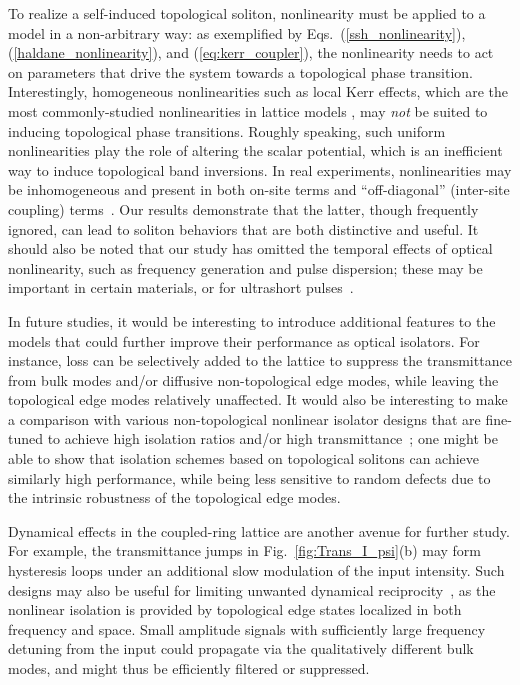 \documentclass[aps,prx,twocolumn,superscriptaddress]{revtex4-1}
\begin{document}
To realize a self-induced topological soliton, nonlinearity must be applied to a model in a non-arbitrary way: as exemplified by Eqs.~(\ref{ssh_nonlinearity}), (\ref{haldane_nonlinearity}), and (\ref{eq:kerr_coupler}), the nonlinearity needs to act on parameters that drive the system towards a topological phase transition.  Interestingly, homogeneous nonlinearities such as local Kerr effects, which are the most commonly-studied nonlinearities in lattice models \cite{Makris2005,Suntsov2006,Suntsov2007,christodoulides1988}, may \textit{not} be suited to inducing topological phase transitions.  Roughly speaking, such uniform nonlinearities play the role of altering the scalar potential, which is an inefficient way to induce topological band inversions.  In real experiments, nonlinearities may be inhomogeneous and present in both on-site terms and ``off-diagonal'' (inter-site coupling) terms~\cite{nonlinear_lattices}.  Our results demonstrate that the latter, though frequently ignored, can lead to soliton behaviors that are both distinctive and useful.  It should also be noted that our study has omitted the temporal effects of optical nonlinearity, such as frequency generation and pulse dispersion; these may be important in certain materials, or for ultrashort pulses~\cite{boyd_book}. 

In future studies, it would be interesting to introduce additional features to the models that could further improve their performance as optical isolators.  For instance, loss can be selectively added to the lattice to suppress the transmittance from bulk modes and/or diffusive non-topological edge modes, while leaving the topological edge modes relatively unaffected.  It would also be interesting to make a comparison with various non-topological nonlinear isolator designs that are fine-tuned to achieve high isolation ratios and/or high transmittance~\cite{lepri2011prl,anand2013nl,lepri2013pre,xu2014prb}; one might be able to show that isolation schemes based on topological solitons can achieve similarly high performance, while being less sensitive to random defects due to the intrinsic robustness of the topological edge modes.

Dynamical effects in the coupled-ring lattice are another avenue for further study. For example, the transmittance jumps in Fig.~\ref{fig:Trans_I_psi}(b) may form hysteresis loops under an additional slow modulation of the input intensity.  Such designs may also be useful for limiting unwanted dynamical reciprocity~\cite{fan2009}, as the nonlinear isolation is provided by topological edge states localized in both frequency and space. Small amplitude signals with sufficiently large frequency detuning from the input could propagate via the qualitatively different bulk modes, and might thus be efficiently filtered or suppressed. 
\end{document}
